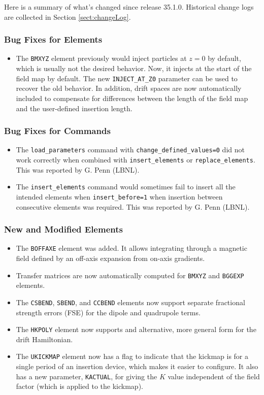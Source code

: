 \documentclass[11pt]{article}
\begin{document}
Here is a summary of what's changed since release 35.1.0.
Historical change logs are collected in Section \ref{sect:changeLog}.

\subsubsection{Bug Fixes for Elements}

\begin{itemize}
\item The \verb|BMXYZ| element previously would inject particles at $z=0$ by default, which is usually not
  the desired behavior. Now, it injects at the start of the field map by default. The new \verb|INJECT_AT_Z0|
  parameter can be used to recover the old behavior. In addition, drift spaces are now automatically included
  to compensate for differences between the length of the field map and the user-defined insertion length.
\end{itemize}

\subsubsection{Bug Fixes for Commands}
\begin{itemize}
\item The \verb|load_parameters| command with \verb|change_defined_values=0| 
  did not work correctly when combined with \verb|insert_elements| or \verb|replace_elements|.
  This was reported by G. Penn (LBNL).
\item The \verb|insert_elements| command would sometimes fail to insert all the intended elements when 
  \verb|insert_before=1| when insertion between consecutive elements was required.
  This was reported by G. Penn (LBNL).
\end{itemize}

\subsubsection{New and Modified Elements}
\begin{itemize}
\item The \verb|BOFFAXE| element was added. It allows integrating through a magnetic field defined by an off-axis
  expansion from on-axis gradients. 
\item Transfer matrices are now automatically computed for \verb|BMXYZ| and \verb|BGGEXP| elements.
\item The \verb|CSBEND|, \verb|SBEND|, and \verb|CCBEND| elements now support separate fractional strength errors (FSE) for
  the dipole and quadrupole terms.
\item The \verb|HKPOLY| element now supports and alternative, more general form for the drift Hamiltonian.
\item The \verb|UKICKMAP| element now has a flag to indicate that the kickmap is for a single period of an insertion
  device, which makes it easier to configure. It also has a new parameter, \verb|KACTUAL|, for giving the $K$ value
  independent of the field factor (which is applied to the kickmap).
\end{itemize}
\end{document}
